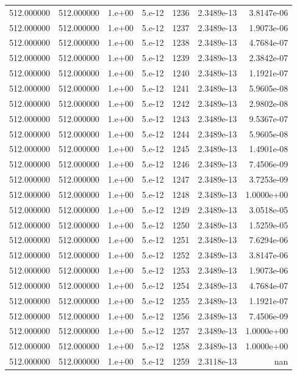 \begin{table}[htbp]
\begin{tabular}{rrrrrrr}
512.000000 & 512.000000 & 1.e+00 & 5.e-12 & 1236 & 2.3489e-13 & 3.8147e-06 \\
512.000000 & 512.000000 & 1.e+00 & 5.e-12 & 1237 & 2.3489e-13 & 1.9073e-06 \\
512.000000 & 512.000000 & 1.e+00 & 5.e-12 & 1238 & 2.3489e-13 & 4.7684e-07 \\
512.000000 & 512.000000 & 1.e+00 & 5.e-12 & 1239 & 2.3489e-13 & 2.3842e-07 \\
512.000000 & 512.000000 & 1.e+00 & 5.e-12 & 1240 & 2.3489e-13 & 1.1921e-07 \\
512.000000 & 512.000000 & 1.e+00 & 5.e-12 & 1241 & 2.3489e-13 & 5.9605e-08 \\
512.000000 & 512.000000 & 1.e+00 & 5.e-12 & 1242 & 2.3489e-13 & 2.9802e-08 \\
512.000000 & 512.000000 & 1.e+00 & 5.e-12 & 1243 & 2.3489e-13 & 9.5367e-07 \\
512.000000 & 512.000000 & 1.e+00 & 5.e-12 & 1244 & 2.3489e-13 & 5.9605e-08 \\
512.000000 & 512.000000 & 1.e+00 & 5.e-12 & 1245 & 2.3489e-13 & 1.4901e-08 \\
512.000000 & 512.000000 & 1.e+00 & 5.e-12 & 1246 & 2.3489e-13 & 7.4506e-09 \\
512.000000 & 512.000000 & 1.e+00 & 5.e-12 & 1247 & 2.3489e-13 & 3.7253e-09 \\
512.000000 & 512.000000 & 1.e+00 & 5.e-12 & 1248 & 2.3489e-13 & 1.0000e+00 \\
512.000000 & 512.000000 & 1.e+00 & 5.e-12 & 1249 & 2.3489e-13 & 3.0518e-05 \\
512.000000 & 512.000000 & 1.e+00 & 5.e-12 & 1250 & 2.3489e-13 & 1.5259e-05 \\
512.000000 & 512.000000 & 1.e+00 & 5.e-12 & 1251 & 2.3489e-13 & 7.6294e-06 \\
512.000000 & 512.000000 & 1.e+00 & 5.e-12 & 1252 & 2.3489e-13 & 3.8147e-06 \\
512.000000 & 512.000000 & 1.e+00 & 5.e-12 & 1253 & 2.3489e-13 & 1.9073e-06 \\
512.000000 & 512.000000 & 1.e+00 & 5.e-12 & 1254 & 2.3489e-13 & 4.7684e-07 \\
512.000000 & 512.000000 & 1.e+00 & 5.e-12 & 1255 & 2.3489e-13 & 1.1921e-07 \\
512.000000 & 512.000000 & 1.e+00 & 5.e-12 & 1256 & 2.3489e-13 & 7.4506e-09 \\
512.000000 & 512.000000 & 1.e+00 & 5.e-12 & 1257 & 2.3489e-13 & 1.0000e+00 \\
512.000000 & 512.000000 & 1.e+00 & 5.e-12 & 1258 & 2.3489e-13 & 1.0000e+00 \\
512.000000 & 512.000000 & 1.e+00 & 5.e-12 & 1259 & 2.3118e-13 & nan \\
\bottomrule
\end{tabular}
\end{table}
